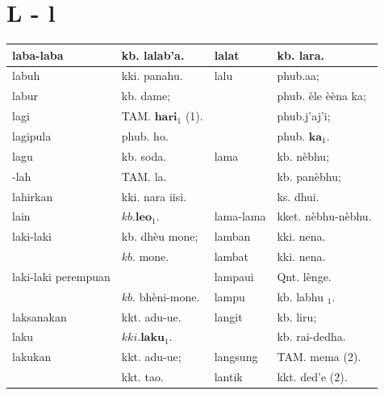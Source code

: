 \documentclass[10pt]{article}
\begin{document}
\section*{L - l}
\begin{center}
\begin{tabular}{|l|l|l|l|}
\hline
laba-laba & kb. lalab'a. & lalat & kb. lara. \\
\hline
labuh & kki. panahu. & lalu & phub.aa; \\
\hline
labur & kb. dame; &  & phub. èle èèna ka; \\
\hline
lagi & TAM. \(\mathbf{h a r i}_{1}\) (1). &  & phub.j'aj'i; \\
\hline
lagipula & phub. ho. &  & phub. \(\mathbf{k a}_{1}\). \\
\hline
lagu & kb. soda. & lama & kb. nèbhu; \\
\hline
-lah & TAM. la. &  & kb. panèbhu; \\
\hline
lahirkan & kki. nara iisi. &  & ks. dhui. \\
\hline
lain & \(k b . \mathbf{l e o}_{1}\). & lama-lama & kket. nèbhu-nèbhu. \\
\hline
laki-laki & kb. dhèu mone; & lamban & kki. nena. \\
\hline
 & \(k b\). mone. & lambat & kki. nena. \\
\hline
laki-laki perempuan &  & lampaui & Qnt. lènge. \\
\hline
 & \(k b\). bhèni-mone. & lampu & kb. labhu \({ }_{1}\). \\
\hline
laksanakan & kkt. adu-ue. & langit & kb. liru; \\
\hline
laku & \(k k i . \mathbf{l a k u}_{1}\). &  & kb. rai-dedha. \\
\hline
lakukan & kkt. adu-ue; & langsung & TAM. mema (2). \\
\hline
 & kkt. tao. & lantik & kkt. ded'e (2). \\
\hline
\end{tabular}
\end{center}
\end{document}
